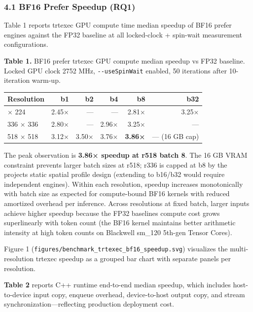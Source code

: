 \documentclass[
]{article}
\newcounter{none} %
\begin{document}
\subsubsection{4.1 BF16 Prefer Speedup
(RQ1)}\label{41-bf16-prefer-speedup-rq1}

Table 1 reports trtexec GPU compute time median speedup of BF16 prefer
engines against the FP32 baseline at all locked-clock + spin-wait
measurement configurations.

\textbf{Table 1.} BF16 prefer trtexec GPU compute median speedup vs FP32
baseline. Locked GPU clock 2752 MHz, \texttt{-\/-useSpinWait} enabled,
50 iterations after 10-iteration warm-up.

{\def\LTcaptype{none} %
\begin{longtable}[]{@{}lrrrrr@{}}
\toprule\noalign{}
Resolution & b1 & b2 & b4 & b8 & b32 \\
\midrule\noalign{}
\endhead
\bottomrule\noalign{}
\endlastfoot
224 × 224 & 2.45× & --- & --- & 2.81× & 3.25× \\
336 × 336 & 2.80× & --- & 2.96× & 3.25× & --- \\
518 × 518 & 3.12× & 3.50× & 3.76× & \textbf{3.86×} & --- (16 GB cap) \\
\end{longtable}
}

The peak observation is \textbf{3.86× speedup at r518 batch 8}. The 16
GB VRAM constraint prevents larger batch sizes at r518; r336 is capped
at b8 by the project\textquotesingle s static spatial profile design
(extending to b16/b32 would require independent engines). Within each
resolution, speedup increases monotonically with batch size as expected
for compute-bound BF16 kernels with reduced amortized overhead per
inference. Across resolutions at fixed batch, larger inputs achieve
higher speedup because the FP32 baseline\textquotesingle s compute cost
grows superlinearly with token count (the BF16 kernel maintains better
arithmetic intensity at high token counts on Blackwell sm\_120 5th-gen
Tensor Cores).

Figure 1 (\texttt{figures/benchmark\_trtexec\_bf16\_speedup.svg})
visualizes the multi-resolution trtexec speedup as a grouped bar chart
with separate panels per resolution.

\textbf{Table 2} reports C++ runtime end-to-end median speedup, which
includes host-to-device input copy, enqueue overhead, device-to-host
output copy, and stream synchronization---reflecting production
deployment cost.
\end{document}
